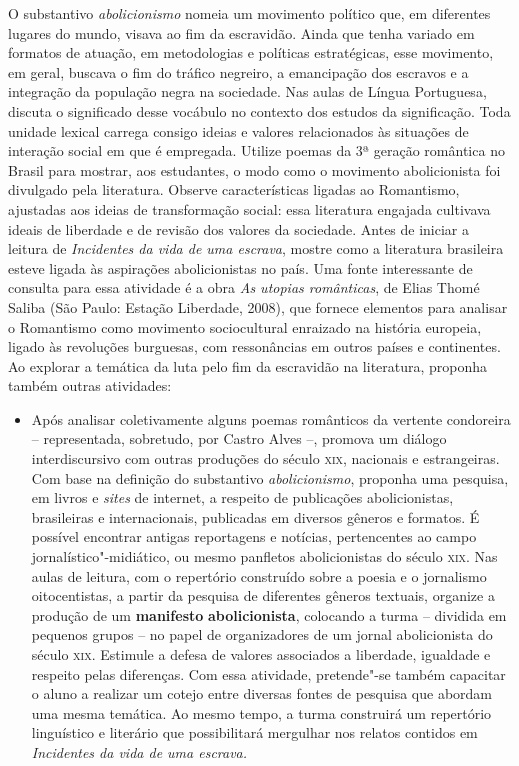 \documentclass[12pt]{extarticle}
\begin{document}
O substantivo \emph{abolicionismo} nomeia um movimento
político que, em diferentes lugares do mundo, visava ao fim da
escravidão. Ainda que tenha variado em formatos de atuação, em
metodologias e políticas estratégicas, esse movimento, em geral, buscava
o fim do tráfico negreiro, a emancipação dos escravos e a integração da
população negra na sociedade. Nas aulas de Língua Portuguesa, discuta o
significado desse vocábulo no contexto dos estudos da significação. Toda
unidade lexical carrega consigo ideias e valores relacionados às
situações de interação social em que é empregada. Utilize poemas da 3ª
geração romântica no Brasil para mostrar, aos estudantes, o modo como o
movimento abolicionista foi divulgado pela literatura. Observe
características ligadas ao Romantismo, ajustadas aos ideias de
transformação social: essa literatura engajada cultivava ideais de
liberdade e de revisão dos valores da sociedade. Antes de iniciar a
leitura de \emph{Incidentes da vida de uma escrava}, mostre como a
literatura brasileira esteve ligada às aspirações abolicionistas no
país. Uma fonte interessante de consulta para essa atividade é a obra
\emph{As utopias românticas}, de Elias Thomé Saliba (São Paulo: Estação
Liberdade, 2008), que fornece elementos para analisar o Romantismo como
movimento sociocultural enraizado na história europeia, ligado às
revoluções burguesas, com ressonâncias em outros países e continentes.
Ao explorar a temática da luta pelo fim da escravidão na literatura,
proponha também outras atividades:

\begin{itemize}
\item
  Após analisar coletivamente alguns poemas românticos da vertente
  condoreira -- representada, sobretudo, por Castro Alves --, promova um
  diálogo interdiscursivo com outras produções do século \textsc{xix}, nacionais
  e estrangeiras. Com base na definição do substantivo
  \emph{abolicionismo}, proponha uma pesquisa, em livros e \emph{sites}
  de internet, a respeito de publicações abolicionistas, brasileiras e
  internacionais, publicadas em diversos gêneros e formatos. É possível
  encontrar antigas reportagens e notícias, pertencentes ao campo
  jornalístico"-midiático, ou mesmo panfletos abolicionistas do século
  \textsc{xix}. Nas aulas de leitura, com o repertório construído sobre a poesia
  e o jornalismo oitocentistas, a partir da pesquisa de diferentes
  gêneros textuais, organize a produção de um \textbf{manifesto}
  \textbf{abolicionista}, colocando a turma -- dividida em pequenos
  grupos -- no papel de organizadores de um jornal abolicionista do
  século \textsc{xix}. Estimule a defesa de valores associados a liberdade,
  igualdade e respeito pelas diferenças. Com essa atividade, pretende"-se
  também capacitar o aluno a realizar um cotejo entre diversas fontes de
  pesquisa que abordam uma mesma temática. Ao mesmo tempo, a turma
  construirá um repertório linguístico e literário que possibilitará
  mergulhar nos relatos contidos em \emph{Incidentes da vida de uma
  escrava.}
\end{itemize}
\end{document}
